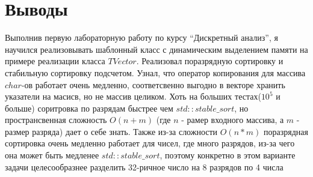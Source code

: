 \section{Выводы}

Выполнив первую лабораторную работу по курсу \enquote{Дискретный анализ}, я научился реализовывать шаблонный класс с динамическим выделением памяти на примере реализации класса $TVector$. Реализовал поразрядную сортировку и стабильную сортировку подсчетом. Узнал, что оператор копирования для массива $char$-ов работает очень медленно, соответсвенно выгодно в векторе хранить указатели на масисв, но не массив целиком. Хоть на больших тестах($10^5$ и больше) соритровка по разрядам быстрее чем $std::stable\_sort$, но пространсвенная сложность $O(n + m)$ (где $n$ - рамер входного массива, а $m$ - размер разряда) дает о себе знать. Также из-за сложности $O(n*m)$ поразрядная сортировка очень медленно работает для чисел, где много разрядов, из-за чего она может быть медленее $std::stable\_sort$, поэтому конкретно в этом варианте задачи целесообразнее разделить 32-ричное число на 8 разрядов по 4 числа
\pagebreak
